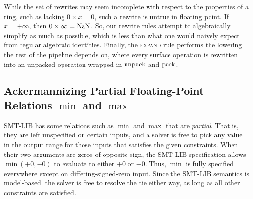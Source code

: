 \begin{figure}
\centering
\small
\begin{minipage}{0.38\textwidth}
\end{minipage}
\end{figure}

While the set of rewrites may seem incomplete with respect to the properties of a ring,
such as lacking $0 \times x = 0$, such a rewrite is untrue in floating point.
If $x = +\infty$, then $0 \times \infty = \mathrm{NaN}$.
So, our rewrite rules attempt to algebraically simplify as much as possible,
which is less than what one would naively expect from regular algebraic identities.
Finally, the \textsc{expand} rule performs the lowering the rest of the pipeline depends on,
where every surface operation is rewritten into an unpacked operation wrapped in $\mathrm{unpack}$ and $\mathrm{pack}$.

\subsection{Ackermannizing Partial Floating-Point Relations $\min$ and $\max$}\label{sec:fp:ackermannization}

SMT-LIB has some relations such as $\min$ and $\max$ that are \emph{partial}.
That is, they are left unspecified on certain inputs,
and a solver is free to pick any value in the output range for those inputs that satisfies the given constraints.
When their two arguments are zeros of opposite sign, the SMT-LIB specification
allows $\min(+0, -0)$ to evaluate to either $+0$ or $-0$.
Thus, $\min$ is fully specified everywhere except on
differing-signed-zero input.
Since the SMT-LIB semantics is model-based, the solver is free to resolve the tie either way,
as long as all other constraints are satisfied.

